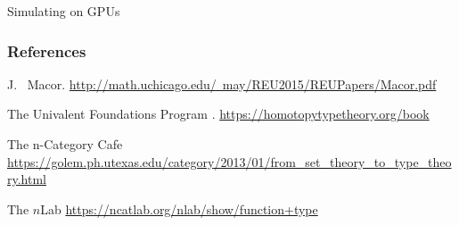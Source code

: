 \documentclass[10pt]{beamer}
\begin{document}
\begin{frame}{Simulating on GPUs}

\end{frame}



\begin{frame}
\frametitle{References}
\begin{thebibliography}{}
J. ~Macor.
\newblock \href{http://math.uchicago.edu/~may/REU2015/REUPapers/Macor.pdf}{\footnotesize http://math.uchicago.edu/~may/REU2015/REUPapers/Macor.pdf}


The {Univalent Foundations Program}
.
\newblock \href{https://homotopytypetheory.org/book}{\footnotesize https://homotopytypetheory.org/book}

    The n-Category Caf$\acute{\text{e}}$
\newblock \href{https://golem.ph.utexas.edu/category/2013/01/from_set_theory_to_type_theory.html}{\footnotesize https://golem.ph.utexas.edu/category/2013/01/from\_set\_theory\_to\_type\_theory.html}

The $n$Lab
\newblock \href{https://ncatlab.org/nlab/show/function+type}{\footnotesize https://ncatlab.org/nlab/show/function+type}

\end{thebibliography}
\end{frame}
\end{document}
